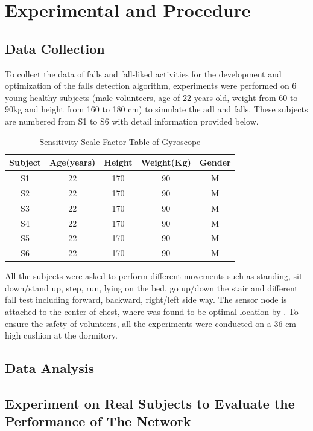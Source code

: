 \documentclass[letterpaper,12pt,titlepage,oneside,final]{book}
\begin{document}
\chapter{Experimental and Procedure}

\section{Data Collection}
To collect the data of falls and fall-liked activities for the development and optimization of the falls detection algorithm, experiments were performed on 6 young healthy subjects (male volunteers, age of 22 years old, weight from 60 to 90kg and height from 160 to 180 cm) to simulate the \gls{adl} and falls. These subjects are numbered from S1 to S6 with detail information provided below.
\begin{table}[h!]
	\begin{center}
		\begin{tabular}{ |c|c|c|c|c| } 
			\hline
			Subject & Age(years) & Height & Weight(Kg) & Gender \\
			\hline
			S1 & 22 & 170 & 90 & M\\
			S2 & 22 & 170 & 90 & M\\
			S3 & 22 & 170 & 90 & M\\
			S4 & 22 & 170 & 90 & M\\
			S5 & 22 & 170 & 90 & M\\
			S6 & 22 & 170 & 90 & M\\
			\hline
		\end{tabular}
		\caption{Sensitivity Scale Factor Table of Gyroscope}
		\label{table:1}
	\end{center}
\end{table}\par
All the subjects were asked to perform different movements such as standing, sit down/stand up, step, run, lying on the bed, go up/down the stair and different fall test including forward, backward, right/left side way. The sensor node is attached to the center of chest, where was found to be optimal location by \cite{optimum_sensor_place}. To ensure the safety of volunteers, all the experiments were conducted on a 36-cm high cushion at the dormitory.
\section{Data Analysis}

\section{Experiment on Real Subjects to Evaluate the Performance of The Network}
\end{document}
